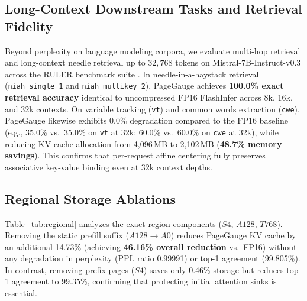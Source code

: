 \documentclass{article}
\begin{document}
\subsection{Long-Context Downstream Tasks and Retrieval Fidelity}
Beyond perplexity on language modeling corpora, we evaluate multi-hop retrieval and long-context needle retrieval up to $32,768$ tokens on Mistral-7B-Instruct-v0.3 across the RULER benchmark suite \citep{hsieh2024ruler}. In needle-in-a-haystack retrieval (\texttt{niah\_single\_1} and \texttt{niah\_multikey\_2}), PageGauge achieves \textbf{100.0\% exact retrieval accuracy} identical to uncompressed FP16 FlashInfer across 8k, 16k, and 32k contexts. On variable tracking (\texttt{vt}) and common words extraction (\texttt{cwe}), PageGauge likewise exhibits 0.0\% degradation compared to the FP16 baseline (e.g., 35.0\% vs.\ 35.0\% on \texttt{vt} at 32k; 60.0\% vs.\ 60.0\% on \texttt{cwe} at 32k), while reducing KV cache allocation from 4,096\,MB to 2,102\,MB (\textbf{48.7\% memory savings}). This confirms that per-request affine centering fully preserves associative key-value binding even at 32k context depths.

\subsection{Regional Storage Ablations}
Table~\ref{tab:regional} analyzes the exact-region components ($S4$, $A128$, $T768$). Removing the static prefill suffix ($A128 \to A0$) reduces PageGauge KV cache by an additional 14.73\% (achieving \textbf{46.16\% overall reduction} vs.\ FP16) without any degradation in perplexity (PPL ratio 0.99991) or top-1 agreement (99.805\%). In contrast, removing prefix pages ($S4$) saves only 0.46\% storage but reduces top-1 agreement to 99.35\%, confirming that protecting initial attention sinks is essential.

\begin{table}[t]
\caption{Mistral-7B regional exact-cache ablation on eight PG-19 books. Removing $A128$ maximizes compression with zero quality loss.}
\label{tab:regional}
\centering\small
{}
\end{table}
\end{document}
